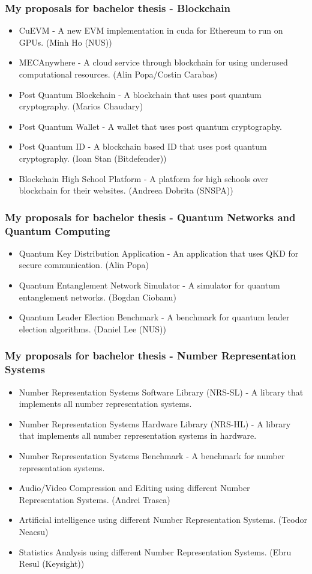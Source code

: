 \begin{frame}
\frametitle{My proposals for bachelor thesis - Blockchain}
\begin{itemize}
    \item CuEVM - A new EVM implementation in cuda for Ethereum to run on GPUs. (Minh Ho (NUS))
    \item MECAnywhere - A cloud service through blockchain for using underused computational resources. (Alin Popa/Costin Carabas)
    \item Post Quantum Blockchain - A blockchain that uses post quantum cryptography. (Marios Chaudary)
    \item Post Quantum Wallet - A wallet that uses post quantum cryptography.
    \item Post Quantum ID - A blockchain based ID that uses post quantum cryptography. (Ioan Stan (Bitdefender))
    \item Blockchain High School Platform - A platform for high schools over blockchain for their websites. (Andreea Dobrita (SNSPA))
\end{itemize}
\end{frame}

\begin{frame}
\frametitle{My proposals for bachelor thesis - Quantum Networks and Quantum Computing}
\begin{itemize}
    \item Quantum Key Distribution Application - An application that uses QKD for secure communication. (Alin Popa)
    \item Quantum Entanglement  Network Simulator - A simulator for quantum entanglement networks. (Bogdan Ciobanu)
    \item Quantum Leader Election Benchmark - A benchmark for quantum leader election algorithms. (Daniel Lee (NUS))
\end{itemize}
\end{frame}

\begin{frame}
\frametitle{My proposals for bachelor thesis - Number Representation Systems}
\begin{itemize}
    \item Number Representation Systems Software Library (NRS-SL) - A library that implements all number representation systems.
    \item Number Representation Systems Hardware Library (NRS-HL) - A library that implements all number representation systems in hardware.
    \item Number Representation Systems Benchmark - A benchmark for number representation systems.
    \item Audio/Video Compression and Editing  using different Number Representation Systems. (Andrei Trasca)
    \item Artificial intelligence  using different Number Representation Systems. (Teodor Neacsu)
    \item Statistics Analysis using different Number Representation Systems. (Ebru Resul (Keysight))
\end{itemize}
\end{frame}

